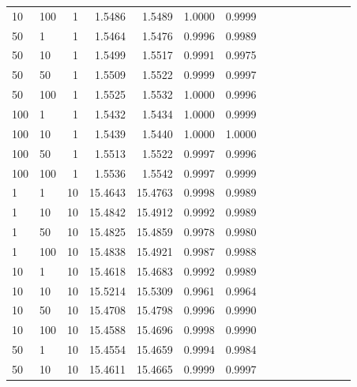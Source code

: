 \begin{longtable}{llr|rrrrrrrrrrrr}
    10 &             100 &                    1 &      1.5486 &     1.5489 &     1.0000 &    0.9999 \\
    50 &               1 &                    1 &      1.5464 &     1.5476 &     0.9996 &    0.9989 \\
    50 &              10 &                    1 &      1.5499 &     1.5517 &     0.9991 &    0.9975 \\
    50 &              50 &                    1 &      1.5509 &     1.5522 &     0.9999 &    0.9997 \\
    50 &             100 &                    1 &      1.5525 &     1.5532 &     1.0000 &    0.9996 \\
    100 &               1 &                    1 &      1.5432 &     1.5434 &     1.0000 &    0.9999 \\
    100 &              10 &                    1 &      1.5439 &     1.5440 &     1.0000 &    1.0000 \\
    100 &              50 &                    1 &      1.5513 &     1.5522 &     0.9997 &    0.9996 \\
    100 &             100 &                    1 &      1.5536 &     1.5542 &     0.9997 &    0.9999 \\
    1 &               1 &                   10 &     15.4643 &    15.4763 &     0.9998 &    0.9989 \\
    1 &              10 &                   10 &     15.4842 &    15.4912 &     0.9992 &    0.9989 \\
    1 &              50 &                   10 &     15.4825 &    15.4859 &     0.9978 &    0.9980 \\
    1 &             100 &                   10 &     15.4838 &    15.4921 &     0.9987 &    0.9988 \\
    10 &               1 &                   10 &     15.4618 &    15.4683 &     0.9992 &    0.9989 \\
    10 &              10 &                   10 &     15.5214 &    15.5309 &     0.9961 &    0.9964 \\
    10 &              50 &                   10 &     15.4708 &    15.4798 &     0.9996 &    0.9990 \\
    10 &             100 &                   10 &     15.4588 &    15.4696 &     0.9998 &    0.9990 \\
    50 &               1 &                   10 &     15.4554 &    15.4659 &     0.9994 &    0.9984 \\
    50 &              10 &                   10 &     15.4611 &    15.4665 &     0.9999 &    0.9997 \\

\end{longtable}
